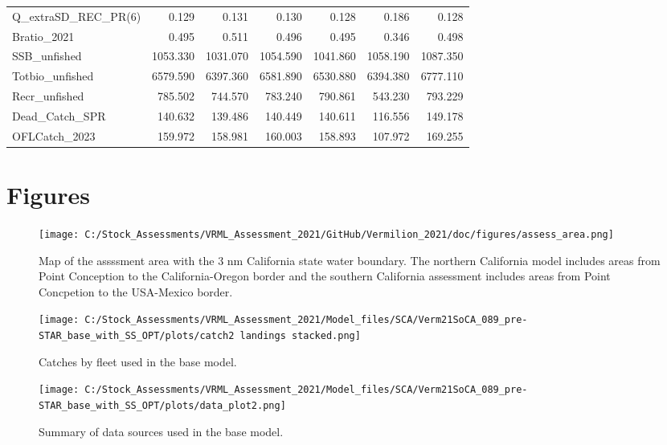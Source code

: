 \documentclass[11pt,
  english,
  a4paper,
]{article}
\begin{document}
\begin{table}
{\begin{tabular}[t]{lrrrrrr}
Q\_extraSD\_REC\_PR(6) & 0.129 & 0.131 & 0.130 & 0.128 & 0.186 & 0.128\\
Bratio\_2021 & 0.495 & 0.511 & 0.496 & 0.495 & 0.346 & 0.498\\
SSB\_unfished & 1053.330 & 1031.070 & 1054.590 & 1041.860 & 1058.190 & 1087.350\\
Totbio\_unfished & 6579.590 & 6397.360 & 6581.890 & 6530.880 & 6394.380 & 6777.110\\
Recr\_unfished & 785.502 & 744.570 & 783.240 & 790.861 & 543.230 & 793.229\\
Dead\_Catch\_SPR & 140.632 & 139.486 & 140.449 & 140.611 & 116.556 & 149.178\\
OFLCatch\_2023 & 159.972 & 158.981 & 160.003 & 158.893 & 107.972 & 169.255\\
\bottomrule
\end{tabular}}
\end{table}

\clearpage


\hypertarget{figures}{%
\section{Figures}\label{figures}}

\leavevmode\tagmcend\tagstructend

\FloatBarrier

\begin{figure}
\centering
\texttt{[image: C:/Stock\_Assessments/VRML\_Assessment\_2021/GitHub/Vermilion\_2021/doc/figures/assess\_area.png]}
\caption{Map of the assssment area with the 3 nm California state water boundary. The northern California model includes areas from Point Conception to the California-Oregon border and the southern California assessment includes areas from Point Concpetion to the USA-Mexico border.\label{fig:assess-area}}
\end{figure}

\begin{figure}
\centering
\texttt{[image: C:/Stock\_Assessments/VRML\_Assessment\_2021/Model\_files/SCA/Verm21SoCA\_089\_pre-STAR\_base\_with\_SS\_OPT/plots/catch2 landings stacked.png]}
\caption{Catches by fleet used in the base model.\label{fig:catch}}
\end{figure}

\begin{figure}
\centering
\texttt{[image: C:/Stock\_Assessments/VRML\_Assessment\_2021/Model\_files/SCA/Verm21SoCA\_089\_pre-STAR\_base\_with\_SS\_OPT/plots/data\_plot2.png]}
\caption{Summary of data sources used in the base model.\label{fig:data-plot}}
\end{figure}
\end{document}
